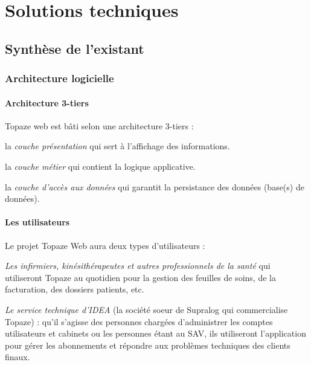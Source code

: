\newpage
\section{Solutions techniques} %




\subsection{Synthèse de l'existant} %
\subsubsection{Architecture logicielle}
\label{sec:architecture}
\paragraph*{Architecture 3-tiers\\}
Topaze web est bâti selon une architecture 3-tiers : 
\begin{sitemize}
\item la \textit{couche présentation} qui sert à l'affichage des informations.
\item la \textit{couche métier} qui contient la logique applicative.
\item la \textit{couche d'accès aux données} qui garantit la persistance des données (base(s) de données). 
\end{sitemize}

\paragraph*{Les utilisateurs\\}
Le projet Topaze Web aura deux types d'utilisateurs : 
\begin{sitemize}
\item \textit{Les infirmiers, kinésithérapeutes et autres professionnels de la santé} qui utiliseront Topaze au quotidien pour la gestion des feuilles de soins, de la facturation, des dossiers patients, etc. 
\item \textit{Le service technique d'IDEA} (la société soeur de Supralog qui commercialise Topaze) : qu’il s’agisse des personnes
chargées d’administrer les comptes utilisateurs et cabinets ou les personnes étant au SAV, ils
utiliseront l’application pour gérer les abonnements et répondre aux problèmes techniques des
clients finaux.
\end{sitemize}

